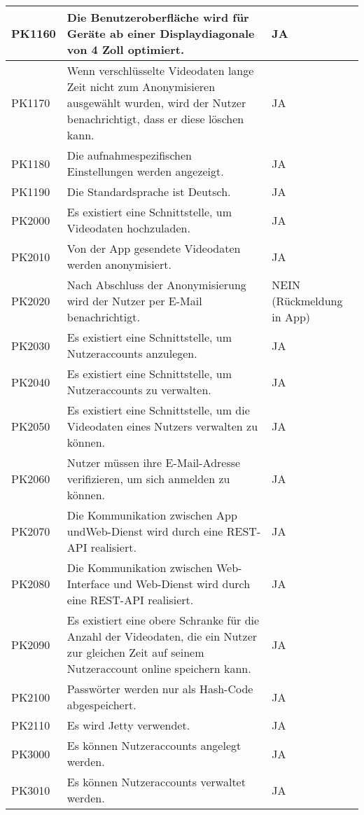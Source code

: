 \begin{longtable}{p{} | p{} | p{}}
   \\
  \hline 
  PK1160 & Die Benutzeroberfläche wird für Geräte ab einer Displaydiagonale von 4 Zoll optimiert. & JA
   \\
  \hline 
  PK1170 & Wenn verschlüsselte Videodaten lange Zeit nicht zum Anonymisieren ausgewählt wurden, wird der Nutzer benachrichtigt, dass er diese löschen kann. & JA
   \\
  \hline 
  PK1180 & Die aufnahmespezifischen Einstellungen werden angezeigt. & JA
   \\
  \hline 
  PK1190 & Die Standardsprache ist Deutsch. & JA
   \\
  \hline 
  PK2000 & Es existiert eine Schnittstelle, um Videodaten hochzuladen. & JA
   \\
  \hline 
  PK2010 & Von der App gesendete Videodaten werden anonymisiert. & JA
   \\
  \hline 
  PK2020 & Nach Abschluss der Anonymisierung wird der Nutzer per E-Mail benachrichtigt. & NEIN (Rückmeldung in App)
   \\
  \hline 
  PK2030 & Es existiert eine Schnittstelle, um Nutzeraccounts anzulegen. & JA
   \\
  \hline 
  PK2040 & Es existiert eine Schnittstelle, um Nutzeraccounts zu verwalten. & JA
   \\
  \hline 
  PK2050 & Es existiert eine Schnittstelle, um die Videodaten eines Nutzers verwalten
zu können. & JA
   \\
  \hline 
  PK2060 & Nutzer müssen ihre E-Mail-Adresse verifizieren, um sich anmelden zu können. & JA
   \\
  \hline 
  PK2070 & Die Kommunikation zwischen App undWeb-Dienst wird durch eine REST-API realisiert. & JA
   \\
  \hline 
  PK2080 & Die Kommunikation zwischen Web-Interface und Web-Dienst wird durch eine REST-API realisiert. & JA
   \\
  \hline 
  PK2090 & Es existiert eine obere Schranke für die Anzahl der Videodaten, die ein Nutzer zur gleichen Zeit auf seinem Nutzeraccount online speichern kann. & JA
   \\
  \hline 
  PK2100 & Passwörter werden nur als Hash-Code abgespeichert. & JA
   \\
  \hline 
  PK2110 & Es wird Jetty verwendet. & JA
   \\
  \hline 
  PK3000 & Es können Nutzeraccounts angelegt werden. & JA
   \\
  \hline 
  PK3010 & Es können Nutzeraccounts verwaltet werden. & JA

\end{longtable}
